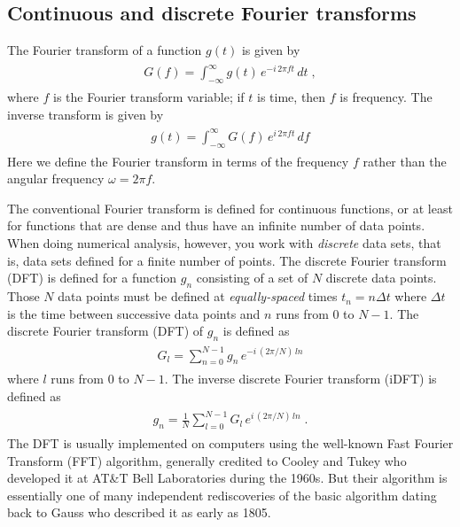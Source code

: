 \documentclass[letterpaper,10pt,english]{sphinxmanual}
\begin{document}
\subsection{Continuous and discrete Fourier transforms}
\label{chap9/chap9_scipy:continuous-and-discrete-fourier-transforms}
The Fourier transform of a function $g(t)$ is given by
\label{chap9/chap9_scipy:equation-eq:FT}\begin{gather}
\begin{split} G(f) = \int_{-\infty}^\infty g(t)\, e^{-i\, 2\pi f t}\, dt \;,\end{split}\label{chap9/chap9_scipy-eq:FT}
\end{gather}
where $f$ is the Fourier transform variable; if $t$ is time, then $f$ is frequency.  The inverse transform is given by
\label{chap9/chap9_scipy:equation-eq:iFT}\begin{gather}
\begin{split} g(t) = \int_{-\infty}^\infty G(f)\, e^{i\, 2\pi ft}\, df\end{split}\label{chap9/chap9_scipy-eq:iFT}
\end{gather}
Here we define the Fourier transform in terms of the frequency $f$ rather than the angular frequency $\omega = 2\pi f$.

The conventional Fourier transform is defined for continuous functions, or at least for functions that are dense and thus have an infinite number of data points.  When doing numerical analysis, however, you work with \emph{discrete} data sets, that is, data sets defined for a finite number of points.  The discrete Fourier transform (DFT) is defined for a function $g_n$ consisting of a set of $N$ discrete data points.  Those $N$ data points must be defined at \emph{equally-spaced} times $t_n=n\Delta t$ where $\Delta t$ is the time between successive data points and $n$ runs from 0 to $N-1$.  The discrete Fourier transform (DFT) of $g_n$ is defined as
\label{chap9/chap9_scipy:equation-eq:DFT}\begin{gather}
\begin{split}G_l = \sum_{n=0}^{N-1} g_n\, e^{-i\,(2\pi/N)\,ln}\end{split}\label{chap9/chap9_scipy-eq:DFT}
\end{gather}
where $l$ runs from 0 to $N-1$.  The inverse discrete Fourier transform (iDFT) is defined as
\label{chap9/chap9_scipy:equation-eq:iDFT}\begin{gather}
\begin{split}g_n = \frac{1}{N} \sum_{l=0}^{N-1} G_l\, e^{i\,(2\pi/N)\,ln} \;.\end{split}\label{chap9/chap9_scipy-eq:iDFT}
\end{gather}
The DFT is usually implemented on computers using the well-known Fast Fourier Transform (FFT) algorithm, generally credited to Cooley and Tukey who developed it at AT\&T Bell Laboratories during the 1960s.  But their algorithm is essentially one of many independent rediscoveries of the basic algorithm dating back to Gauss who described it as early as 1805.
\end{document}
